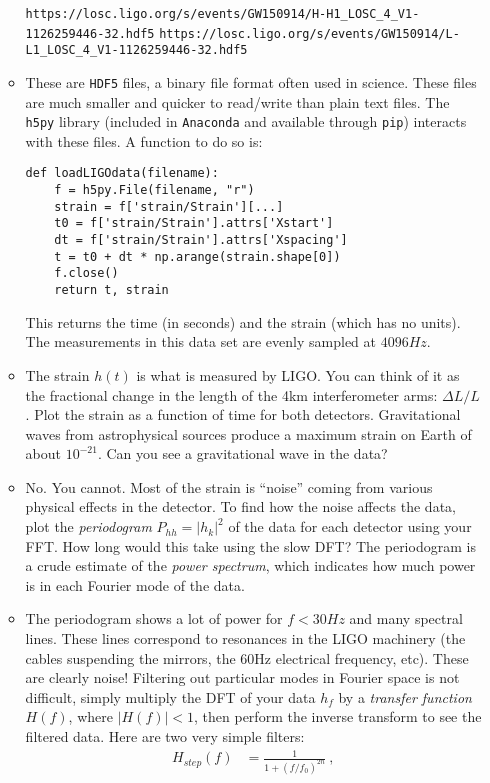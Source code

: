 \documentclass{article}
\newcommand{\Anaconda}{{\texttt{Anaconda}}}
\begin{document}
\begin{enumerate}
\begin{itemize}
			\texttt{https://losc.ligo.org/s/events/GW150914/H-H1\_LOSC\_4\_V1-1126259446-32.hdf5}
			\texttt{https://losc.ligo.org/s/events/GW150914/L-L1\_LOSC\_4\_V1-1126259446-32.hdf5}
			\item These are \texttt{HDF5} files, a binary file format often used in science. These files are much smaller and quicker to read/write than plain text files.  The \texttt{h5py} library (included in \Anaconda{} and available through \texttt{pip}) interacts with these files.  A function to do so is:
				\begin{lstlisting}
def loadLIGOdata(filename):
	f = h5py.File(filename, "r")
	strain = f['strain/Strain'][...]
	t0 = f['strain/Strain'].attrs['Xstart']
	dt = f['strain/Strain'].attrs['Xspacing']
	t = t0 + dt * np.arange(strain.shape[0])
	f.close()
	return t, strain
				\end{lstlisting}
				This returns the time (in seconds) and the strain (which has no units).  The measurements in this data set are evenly sampled at $4096 Hz$.  
			\item The strain $h(t)$ is what is measured by LIGO. You can think of it as the fractional change in the length of the 4km interferometer arms: $\Delta L / L$.  Plot the strain as a function of time for both detectors. Gravitational waves from astrophysical sources produce a maximum strain on Earth of about $10^{-21}$. Can you see a gravitational wave in the data?
			\item No.  You cannot.  Most of the strain is ``noise'' coming from various physical effects in the detector.  To find how the noise affects the data, plot the \emph{periodogram}  $P_{hh} = |h_k|^2$ of the data for each detector using your FFT. How long would this take using the slow DFT?  The periodogram is a crude estimate of the \emph{power spectrum}, which indicates how much power is in each Fourier mode of the data.
			\item The periodogram shows a lot of power for $f < 30 Hz$ and many spectral lines.  These lines correspond to resonances in the LIGO machinery (the cables suspending the mirrors, the 60Hz electrical frequency, etc).  These are clearly noise!  Filtering out particular modes in Fourier space is not difficult, simply multiply the DFT of your data $h_f$ by a \emph{transfer function} $H(f)$, where $|H(f)| < 1$, then perform the inverse transform to see the filtered data.  Here are two very simple filters:
			\begin{align}
				H_{step}(f) &= \frac{1}{1+(f/f_0)^{2n}} \ , \\

\end{align}
\end{itemize}
\end{enumerate}
\end{document}
